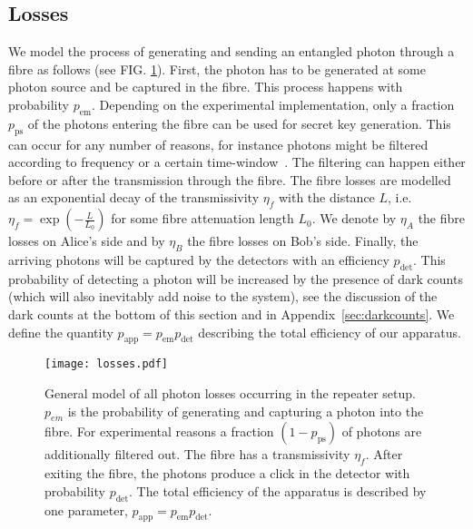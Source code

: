 \documentclass[aps,pra,reprint,superscriptaddress]{revtex4-1}
\begin{document}
\subsection*{Losses}
We model the process of generating and sending an entangled photon through a fibre as follows (see FIG. \ref{fig:losses}). 
First, the photon has to be generated at some photon source and be captured in the fibre. This process happens with probability $p_{\textrm{em}}$. Depending on the experimental implementation, only a fraction $p_{\textrm{ps}}$ of the photons entering the fibre can be used for secret key generation. This can occur for any number of reasons, for instance photons might be filtered according to frequency or a certain time-window~\cite{reiserer2015cavity, gao2015coherent}. The filtering can happen either before or after the transmission through the fibre. The fibre losses are modelled as an exponential decay of the transmissivity $\eta_f$ with the distance $L$, i.e.~$\eta_f = \exp(-\frac{L}{L_0})$ for some fibre attenuation length $L_0$. We denote by $\eta_A$ the fibre losses on Alice's side and by $\eta_B$ the fibre losses on Bob's side. Finally, the arriving photons will be captured by the detectors with an efficiency $p_\textrm{det}$. This probability of detecting a photon will be increased by the presence of dark counts (which will also inevitably add noise to the system), see the discussion of the dark counts at the bottom of this section and in Appendix~\ref{sec:darkcounts}. We define the quantity $p_{\textrm{app}} = p_{\textrm{em}}p_{\textrm{det}}$ describing the total efficiency of our apparatus.


\begin{center}
\begin{figure}
\centering
\texttt{[image: losses.pdf]}
\caption{General model of all photon losses occurring in the repeater setup. $p_{em}$ is the probability of generating and capturing a photon into the fibre. For experimental reasons a fraction $(1-p_\textrm{ps})$ of photons are additionally filtered out. The fibre has a transmissivity $\eta_{f}$. After exiting the fibre, the photons produce a click in the detector with probability $p_\textrm{det}$. The total efficiency of the apparatus is described by one parameter, $p_{\textrm{app}} = p_{\textrm{em}}p_{\textrm{det}}$.}
\label{fig:losses}
\end{figure}
\end{center}
\end{document}
